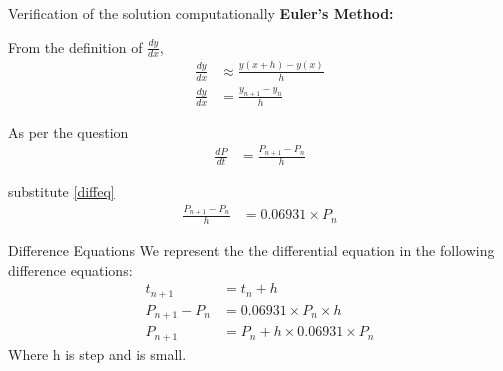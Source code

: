 \documentclass{beamer}
\providecommand{\brak}[1]{\ensuremath{\left(#1\right)}}
\theoremstyle{remark}
\numberwithin{equation}{section}
\begin{document}
\begin{frame}{Verification of the solution computationally}
    \textbf{Euler's Method:}

    From the definition of $\frac{dy}{dx}$,
    \begin{align}
        \frac{dy}{dx} &\approx \frac{y\brak{x + h} - y\brak{x}}{h}\\
        \frac{dy}{dx} &= \frac{y_{n+1} - y_n}{h}
    \end{align}

    As per the question
    \begin{align}
        \frac{dP}{dt} &= \frac{P_{n+1} - P_n}{h}
    \end{align}

    substitute \eqref{diffeq}
    \begin{align}
        \frac{P_{n+1} - P_n}{h} &= 0.06931\times P_n
    \end{align}
\end{frame}
\begin{frame}{Difference Equations}
    We represent the the differential equation in the following difference equations:
    \begin{align}
        t_{n+1} &= t_{n}+h \\
        P_{n+1} - P_n &= 0.06931\times P_n \times h\\
        P_{n+1} &= P_{n}+h \times 0.06931 \times P_n
    \end{align}
    Where h is step and is small.
\end{frame}
\end{document}
